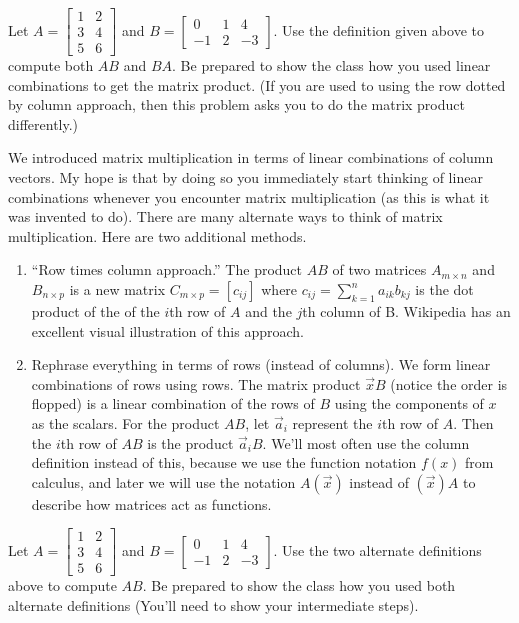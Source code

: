\begin{problem}
Let 
$A = 
\begin{bmatrix}
1&2\\
3&4\\
5&6
\end{bmatrix}
$ 
and
$B = 
\begin{bmatrix}
0&1&4\\
-1&2&-3
\end{bmatrix}
$.
Use the definition given above to compute both $AB$ and $BA$. Be prepared to show the class how you used linear combinations to get the matrix product.  (If you are used to using the row dotted by column approach, then this problem asks you to do the matrix product differently.)
\end{problem}

We introduced matrix multiplication in terms of linear combinations of column vectors. My hope is that by doing so you immediately start thinking of linear combinations whenever you encounter matrix multiplication (as this is what it was invented to do).  There are many alternate ways to think of matrix multiplication. Here are two additional methods. 
\begin{enumerate}
	\item ``Row times column approach.'' The product {$AB$} of two matrices {$A_{m\times n}$} and {$B_{n\times p}$} is a new matrix {$C_{m\times p}=[c_{ij}]$} where $c_{ij}=\sum_{k=1}^n a_{ik}b_{kj}$ is the dot product of the of the {$i$}th row of {$A$} and the {$j$}th column of B.  Wikipedia has an excellent visual illustration of this approach.	
	 
	\item Rephrase everything in terms of rows (instead of columns). We form linear combinations of rows using rows.  The matrix product $\vec x B$ (notice the order is flopped) is a linear combination of the rows of $B$ using the components of $x$ as the scalars. For the product $AB$, let $\vec a_i$ represent the $i$th row of $A$.  Then the $i$th row of $AB$ is the product $\vec a_iB$. We'll most often use the column definition instead of this, because we use the function notation $f(x)$ from calculus, and later we will use the notation $A(\vec x)$ instead of $(\vec x)A$ to describe how matrices act as functions. 
\end{enumerate}


\begin{problem}
Let 
$A = 
\begin{bmatrix}
1&2\\
3&4\\
5&6
\end{bmatrix}
$ 
and
$B = 
\begin{bmatrix}
0&1&4\\
-1&2&-3
\end{bmatrix}
$.
Use the two alternate definitions above to compute $AB$. Be prepared to show the class how you used both alternate definitions (You'll need to show your intermediate steps).
\end{problem}


